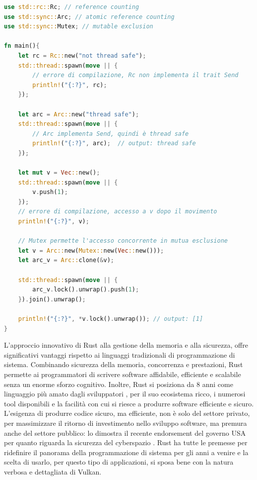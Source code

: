 \vspace{5mm}
\begin{lstlisting}[language=Rust, caption=Fearless concurrency, label=lis:rust_fearless_concurrency]
use std::rc::Rc; // reference counting
use std::sync::Arc; // atomic reference counting
use std::sync::Mutex; // mutable exclusion

fn main(){
    let rc = Rc::new("not thread safe");
    std::thread::spawn(move || {
        // errore di compilazione, Rc non implementa il trait Send
        println!("{:?}", rc);
    });

    let arc = Arc::new("thread safe");
    std::thread::spawn(move || {
        // Arc implementa Send, quindi è thread safe
        println!("{:?}", arc);  // output: thread safe
    });

    let mut v = Vec::new();
    std::thread::spawn(move || {
        v.push(1);
    });
    // errore di compilazione, accesso a v dopo il movimento
    println!("{:?}", v);

    // Mutex permette l'accesso concorrente in mutua esclusione
    let v = Arc::new(Mutex::new(Vec::new()));
    let arc_v = Arc::clone(&v);

    std::thread::spawn(move || {
        arc_v.lock().unwrap().push(1);
    }).join().unwrap();

    println!("{:?}", *v.lock().unwrap()); // output: [1]
}
\end{lstlisting}
\vspace{5mm}

L'approccio innovativo di Rust alla gestione della memoria e alla sicurezza, offre significativi vantaggi rispetto ai linguaggi tradizionali di programmazione di sistema. Combinando sicurezza della memoria, concorrenza e prestazioni, Rust permette ai programmatori di scrivere software affidabile, efficiente e scalabile senza un enorme sforzo cognitivo. Inoltre, Rust si posiziona da 8 anni come linguaggio più amato dagli sviluppatori \cite[]{Rust:love}, per il suo ecosistema ricco, i numerosi tool disponibili e la facilità con cui si riesce a produrre software efficiente e sicuro. L'esigenza di produrre codice sicuro, ma efficiente, non è solo del settore privato, per massimizzare il ritorno di investimento nello sviluppo software, ma premura anche del settore pubblico: lo dimostra il recente endorsement del governo USA per quanto riguarda la sicurezza del cyberspazio \cite[]{Gov:rust_use}. Rust ha tutte le premesse per ridefinire il panorama della programmazione di sistema per gli anni a venire e la scelta di usarlo, per questo tipo di applicazioni, si sposa bene con la natura verbosa e dettagliata di Vulkan.
